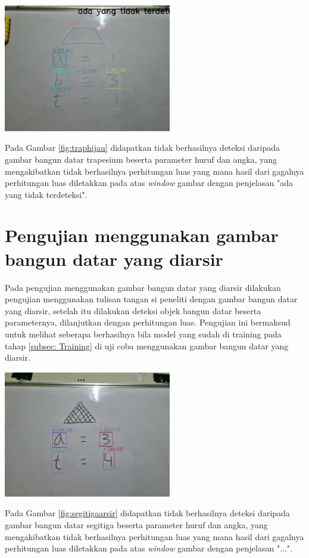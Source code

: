 \begin{center}
	\includegraphics[width=0.55\textwidth]{gambar/trapesium hijau.png}
	\label{fig:traphijau}
\end{center}
Pada Gambar \ref{fig:traphijau} didapatkan tidak berhasilnya deteksi daripada gambar bangun datar trapesium beserta parameter huruf dan angka, yang mengakibatkan tidak berhasilnya perhitungan luas yang mana hasil dari gagalnya perhitungan luas diletakkan pada atas \textit{window} gambar dengan penjelasan "ada yang tidak terdeteksi".

\section{Pengujian menggunakan gambar bangun datar yang diarsir}
Pada pengujian menggunakan gambar bangun datar yang diarsir dilakukan pengujian menggunakan tulisan tangan si peneliti dengan gambar bangun datar yang diarsir, setelah itu dilakukan deteksi objek bangun datar beserta parameternya, dilanjutkan dengan perhitungan luas. Pengujian ini bermaksud untuk melihat seberapa berhasilnya bila model yang sudah di training pada tahap \ref{subsec: Training} di uji coba menggunakan gambar bangun datar yang diarsir.

\begin{center}
	\includegraphics[width=0.55\textwidth]{gambar/segitiga arsir.png}
	\label{fig:segitigaarsir}
\end{center}
Pada Gambar \ref{fig:segitigaarsir} didapatkan tidak berhasilnya deteksi daripada gambar bangun datar segitiga beserta parameter huruf dan angka, yang mengakibatkan tidak berhasilnya perhitungan luas yang mana hasil dari gagalnya perhitungan luas diletakkan pada atas \textit{window} gambar dengan penjelasan "...".

